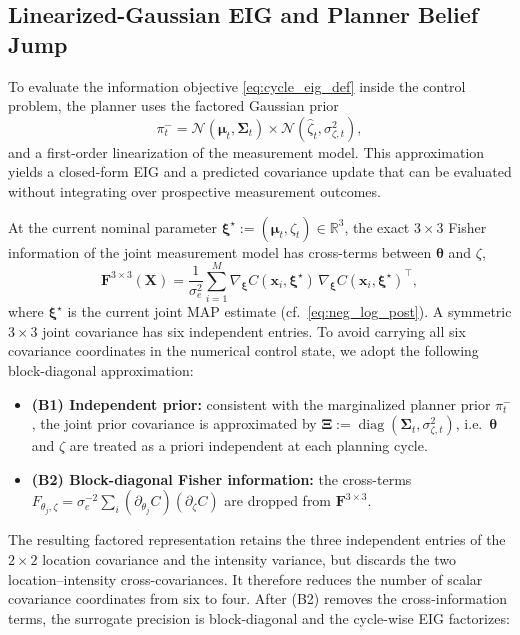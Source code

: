 \documentclass{article}
\DeclareMathOperator{\diag}{diag}
\newcommand{\R}{\mathbb{R}}
\newcommand{\bs}[1]{\boldsymbol{#1}}
\newcommand{\x}{\mathbf{x}}
\newcommand{\bX}{\mathbf{X}}
\begin{document}
\subsection{Linearized-Gaussian EIG and Planner Belief Jump}
\label{sec:eig_computation}

To evaluate the information objective \eqref{eq:cycle_eig_def} inside the control problem, the planner uses the factored Gaussian prior
\begin{equation}
\pi_t^-=\mathcal N(\bs\mu_t,\bs\Sigma_t)\times\mathcal N(\hat\zeta_t,\sigma_{\zeta,t}^2),
\end{equation}
and a first-order linearization of the measurement model.
This approximation yields a closed-form EIG and a predicted covariance update that can be evaluated without integrating over prospective measurement outcomes.

At the current nominal parameter
$\bs\xi^\star:=(\bs\mu_t,\hat\zeta_t)\in\R^3$, the exact
$3\times3$ Fisher information of the joint measurement model has cross-terms between $\bs\theta$ and $\zeta$,
\begin{equation}
\bs F^{3\times3}(\bX)
=\frac{1}{\sigma_e^2}\sum_{i=1}^M
\nabla_{\bs\xi}C(\x_i,\bs\xi^\star)\,
\nabla_{\bs\xi}C(\x_i,\bs\xi^\star)^\top,
\end{equation}
where $\bs\xi^\star$ is the current joint MAP estimate (cf.\ \eqref{eq:neg_log_post}).
A symmetric $3\times3$ joint covariance has six independent entries.
To avoid carrying all six covariance coordinates in the numerical control state, we adopt the following block-diagonal approximation:

\begin{itemize}
\item \textbf{(B1) Independent prior:} consistent with the marginalized planner prior $\pi_t^-$, the joint prior covariance is approximated by $\bs\Xi:=\diag(\bs\Sigma_t,\sigma_{\zeta,t}^2)$, i.e.\ $\bs\theta$ and $\zeta$ are treated as a priori independent at each planning cycle.
\item \textbf{(B2) Block-diagonal Fisher information:} the cross-terms $F_{\theta_j,\zeta}=\sigma_e^{-2}\sum_i(\partial_{\theta_j}C)(\partial_\zeta C)$ are dropped from $\bs F^{3\times3}$.
\end{itemize}

The resulting factored representation retains the three independent entries of the $2\times2$ location covariance and the intensity variance, but discards the two location--intensity cross-covariances.
It therefore reduces the number of scalar covariance coordinates from six to four.
After (B2) removes the cross-information terms, the surrogate precision is block-diagonal and the cycle-wise EIG factorizes:
\end{document}
